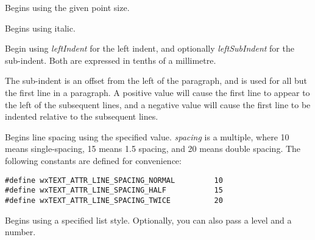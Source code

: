 
Begins using the given point size.

\label{wxrichtextbufferbeginitalic}


Begins using italic.

\label{wxrichtextbufferbeginleftindent}


Begin using {\it leftIndent} for the left indent, and optionally {\it leftSubIndent} for
the sub-indent. Both are expressed in tenths of a millimetre.

The sub-indent is an offset from the left of the paragraph, and is used for all but the
first line in a paragraph. A positive value will cause the first line to appear to the left
of the subsequent lines, and a negative value will cause the first line to be indented
relative to the subsequent lines.

\label{wxrichtextbufferbeginlinespacing}


Begins line spacing using the specified value. {\it spacing} is a multiple, where 10 means single-spacing,
15 means 1.5 spacing, and 20 means double spacing. The following constants are
defined for convenience:

{\small
\begin{verbatim}
#define wxTEXT_ATTR_LINE_SPACING_NORMAL         10
#define wxTEXT_ATTR_LINE_SPACING_HALF           15
#define wxTEXT_ATTR_LINE_SPACING_TWICE          20
\end{verbatim}
}

\label{wxrichtextbufferbeginliststyle}


Begins using a specified list style. Optionally, you can also pass a level and a number.

\label{wxrichtextbufferbeginnumberedbullet}


